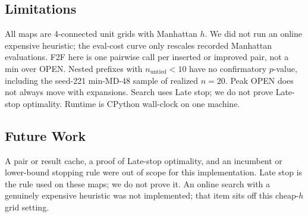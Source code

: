 \subsection{Limitations}

All maps are 4-connected unit grids with Manhattan \(h\). We did not run an online expensive heuristic; the eval-cost curve only rescales recorded Manhattan evaluations. F2F here is one pairwise call per inserted or improved pair, not a min over OPEN. Nested prefixes with \(n_{\mathrm{untied}}<10\) have no confirmatory \(p\)-value, including the seed-221 min-MD-48 sample of realized \(n=20\). Peak OPEN does not always move with expansions. Search uses Late stop; we do not prove Late-stop optimality. Runtime is CPython wall-clock on one machine.

\subsection{Future Work}

A pair or result cache, a proof of Late-stop optimality, and an incumbent or lower-bound stopping rule were out of scope for this implementation. Late stop is the rule used on these maps; we do not prove it. An online search with a genuinely expensive heuristic was not implemented; that item sits off this cheap-\(h\) grid setting.
